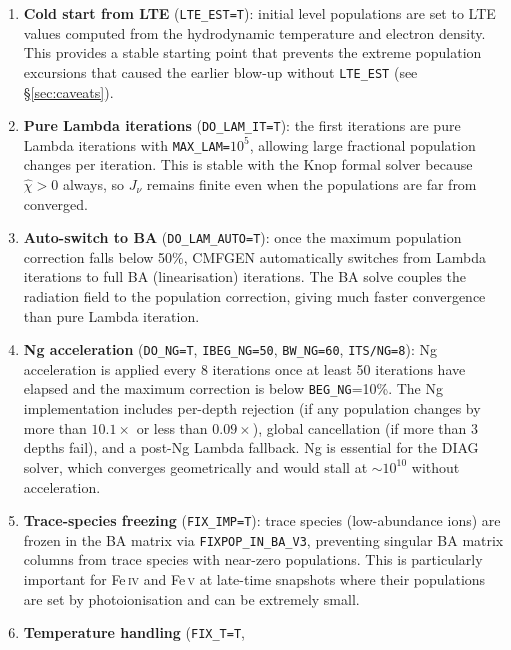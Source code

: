 \documentclass[11pt]{article}
\begin{document}
\begin{enumerate}[nosep]
  \item \textbf{Cold start from LTE} (\texttt{LTE\_EST=T}): initial
        level populations are set to LTE values computed from the
        hydrodynamic temperature and electron density.  This provides a
        stable starting point that prevents the extreme population
        excursions that caused the earlier blow-up without
        \texttt{LTE\_EST} (see \S\ref{sec:caveats}).
  \item \textbf{Pure Lambda iterations} (\texttt{DO\_LAM\_IT=T}): the
        first iterations are pure Lambda iterations with
        \texttt{MAX\_LAM=$10^{5}$}, allowing large fractional population
        changes per iteration.  This is stable with the Knop formal
        solver because $\hat\chi > 0$ always, so $J_\nu$ remains finite
        even when the populations are far from converged.
  \item \textbf{Auto-switch to BA} (\texttt{DO\_LAM\_AUTO=T}): once the
        maximum population correction falls below 50\%, CMFGEN
        automatically switches from Lambda iterations to full BA
        (linearisation) iterations.  The BA solve couples the radiation
        field to the population correction, giving much faster
        convergence than pure Lambda iteration.
  \item \textbf{Ng acceleration} (\texttt{DO\_NG=T},
        \texttt{IBEG\_NG=50}, \texttt{BW\_NG=60}, \texttt{ITS/NG=8}):
        Ng acceleration is applied every 8 iterations once at least 50
        iterations have elapsed and the maximum correction is below
        \texttt{BEG\_NG}=10\%.  The Ng implementation includes
        per-depth rejection (if any population changes by more than
        $10.1\times$ or less than $0.09\times$), global cancellation
        (if more than 3 depths fail), and a post-Ng Lambda fallback.
        Ng is essential for the DIAG solver, which converges
        geometrically and would stall at $\sim 10^{10}$ without
        acceleration.
  \item \textbf{Trace-species freezing} (\texttt{FIX\_IMP=T}): trace
        species (low-abundance ions) are frozen in the BA matrix via
        \texttt{FIXPOP\_IN\_BA\_V3}, preventing singular BA matrix
        columns from trace species with near-zero populations.  This
        is particularly important for Fe\,\textsc{iv} and Fe\,\textsc{v}
        at late-time snapshots where their populations are set by
        photoionisation and can be extremely small.
  \item \textbf{Temperature handling} (\texttt{FIX\_T=T},

\end{enumerate}
\end{document}
